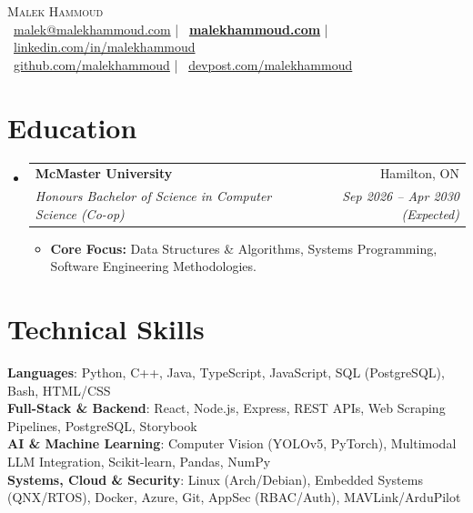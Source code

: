 \documentclass[letterpaper,9.5pt]{article}
\makeatletter
\newcommand{\resumeItem}[1]{
  \item\small{#1 \vspace{-3.5pt}}
}
\newcommand{\resumeSubheading}[4]{
  \vspace{-3pt}\item
    \begin{tabular*}{0.97\textwidth}{l@{\extracolsep{\fill}}r}
      \textbf{#1} & #2 \\
      \textit{\small#3} & \textit{\small #4} \\
    \end{tabular*}\vspace{-7pt}
}
\newcommand{\resumeSubHeadingListStart}{\begin{itemize}[leftmargin=*, label={}]}
\newcommand{\resumeSubHeadingListEnd}{\end{itemize}}
\newcommand{\resumeItemListStart}{\begin{itemize}[leftmargin=1.5em, label=\textbullet]}
\newcommand{\resumeItemListEnd}{\end{itemize}\vspace{-6pt}}
\makeatother
\begin{document}
\begin{center}
    {\Huge \scshape Malek Hammoud} \\ \vspace{3pt}
    \small
    \faEnvelope\ \href{mailto:malek@malekhammoud.com}{malek@malekhammoud.com} \quad|\quad
    \faGlobe\ \href{https://malekhammoud.com/}{\textbf{malekhammoud.com}} \quad|\quad
    \faLinkedin\ \href{https://linkedin.com/in/malekhammoud}{linkedin.com/in/malekhammoud} \\ \vspace{3pt}
    \faGithub\ \href{https://github.com/malekhammoud}{github.com/malekhammoud} \quad|\quad
    \faLaptopCode\ \href{https://devpost.com/malekhammoud}{devpost.com/malekhammoud}
\end{center}
\vspace{-12pt}

\section{Education}
\resumeSubHeadingListStart
  \resumeSubheading
    {McMaster University}{Hamilton, ON}
    {Honours Bachelor of Science in Computer Science (Co-op)}{Sep 2026 -- Apr 2030 (Expected)}
    \resumeItemListStart
      \resumeItem{\textbf{Core Focus:} Data Structures \& Algorithms, Systems Programming, Software Engineering Methodologies.}
    \resumeItemListEnd
\resumeSubHeadingListEnd

\section{Technical Skills}
\begin{itemize}[leftmargin=0.15in, label={}]
  \small{\item{
    \textbf{Languages}{: Python, C++, Java, TypeScript, JavaScript, SQL (PostgreSQL), Bash, HTML/CSS} \\
    \textbf{Full-Stack \& Backend}{: React, Node.js, Express, REST APIs, Web Scraping Pipelines, PostgreSQL, Storybook} \\
    \textbf{AI \& Machine Learning}{: Computer Vision (YOLOv5, PyTorch), Multimodal LLM Integration, Scikit-learn, Pandas, NumPy} \\
    \textbf{Systems, Cloud \& Security}{: Linux (Arch/Debian), Embedded Systems (QNX/RTOS), Docker, Azure, Git, AppSec (RBAC/Auth), MAVLink/ArduPilot}
  }}
\end{itemize}
\vspace{-10pt}
\end{document}
